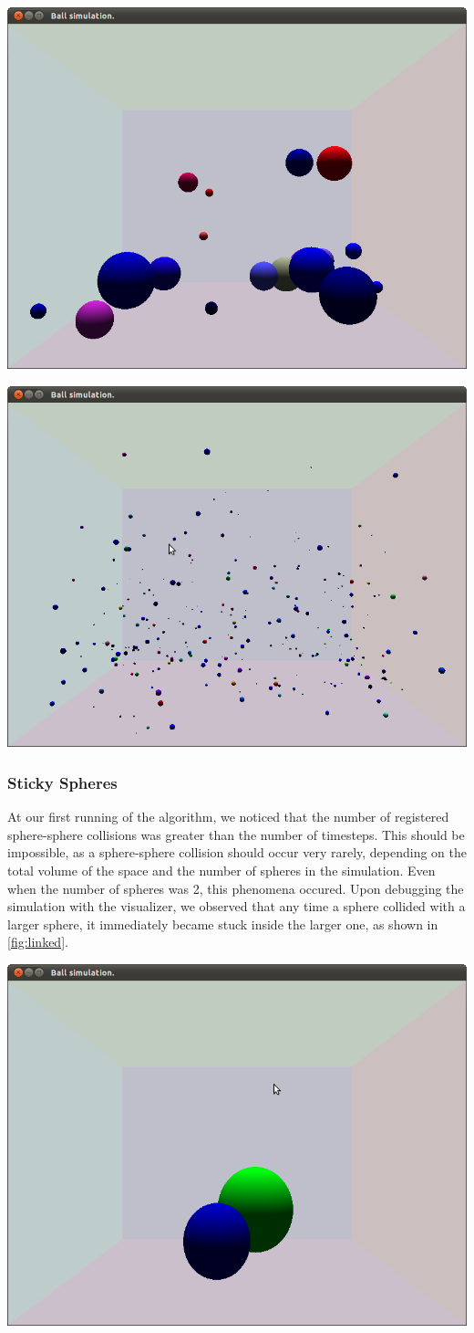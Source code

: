 \documentclass[conference]{IEEEtran}
\begin{document}
\begin{center}
	\includegraphics[width=.45\textwidth]{few.png}
	\label{fig:few}
\end{center}

\begin{center}
	\includegraphics[width=.45\textwidth]{lots.png}
	\label{fig:lots}
\end{center}

\subsubsection{Sticky Spheres}
At our first running of the algorithm, we noticed that the number of registered sphere-sphere collisions was greater than the number of timesteps.  This should be impossible, as a sphere-sphere collision should
occur very rarely, depending on the total volume of the space and the number of spheres in the simulation.  Even when the number of spheres was 2, this phenomena occured.  Upon debugging the simulation with the visualizer,
we observed that any time a sphere collided with a larger sphere, it immediately became stuck inside the larger one, as shown in \ref{fig:linked}.  

\begin{center}
	\includegraphics[width=.45\textwidth]{linked.png}
	\label{fig:linked}
\end{center}
\end{document}
